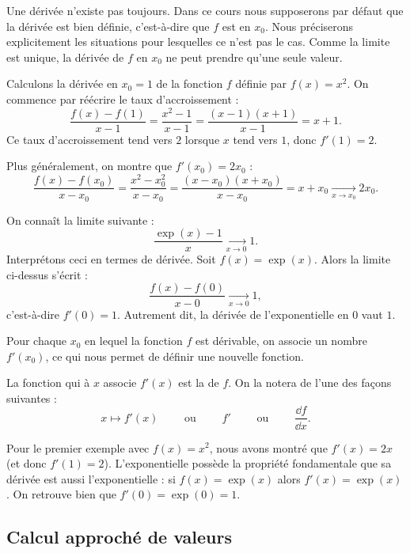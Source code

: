 \documentclass[11pt,class=report,crop=false]{standalone}
\begin{document}
\begin{remarque*}
Une dérivée n'existe pas toujours. Dans ce cours nous supposerons par défaut que la dérivée est bien définie, c'est-à-dire que $f$ est  en $x_0$. Nous préciserons explicitement les situations pour lesquelles ce n'est pas le cas. Comme la limite est unique, la dérivée de $f$ en $x_0$ ne peut prendre qu'une seule valeur.
\end{remarque*}


\begin{exemple}
Calculons la dérivée en $x_0=1$ de la fonction $f$ définie par $f(x)=x^2$.
On commence par réécrire le taux d'accroissement :
$$\frac{f(x)-f(1)}{x-1} = \frac{x^2-1}{x-1} = \frac{(x-1)(x+1)}{x-1}=x+1.$$
Ce taux d'accroissement tend vers $2$ lorsque $x$ tend vers $1$, donc $f'(1)=2$.

Plus généralement, on montre que $f'(x_0)=2x_0$ :
$$\frac{f(x)-f(x_0)}{x-x_0} = \frac{x^2-x_0^2}{x-x_0} = \frac{(x-x_0)(x+x_0)}{x-x_0}=x+x_0 \xrightarrow[x \to x_0]{} 2x_0.$$
\end{exemple}

\begin{exemple}
On connaît la limite suivante :
$$\frac{\exp(x)-1}{x}  \xrightarrow[x \to 0]{} 1.$$
Interprétons ceci en termes de dérivée. Soit $f(x) = \exp(x)$. 
Alors la limite ci-dessus s'écrit :
$$\frac{f(x)-f(0)}{x-0} \xrightarrow[x \to 0]{} 1,$$
c'est-à-dire $f'(0)=1$. Autrement dit, la dérivée de l'exponentielle en $0$ vaut $1$.
\end{exemple} 


Pour chaque $x_0$ en lequel la fonction $f$ est dérivable, on associe un nombre $f'(x_0)$, ce qui nous permet de définir une nouvelle fonction.
\begin{definition}
La fonction qui à $x$ associe $f'(x)$ est la  de $f$.
On la notera de l'une des façons suivantes :
$$x \mapsto f'(x)\qquad \text{ ou } \qquad  f' \qquad \text{ ou } \qquad \frac{\dd f}{\dd x}.$$
\end{definition}

Pour le premier exemple avec $f(x)=x^2$, nous avons montré que $f'(x) = 2x$ (et donc $f'(1)=2$).
L'exponentielle possède la propriété fondamentale que sa dérivée est aussi l'exponentielle :
si $f(x)= \exp(x)$ alors $f'(x)=\exp(x)$. On retrouve bien que $f'(0)=\exp(0)=1$.


\subsection{Calcul approché de valeurs}
\end{document}
